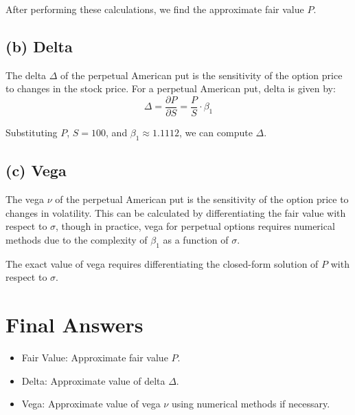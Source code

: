 \documentclass{article}
\begin{document}
After performing these calculations, we find the approximate fair value \( P \).

\subsection{\textbf{(b) Delta}}

The delta \( \Delta \) of the perpetual American put is the sensitivity of the option price to changes in the stock price. For a perpetual American put, delta is given by:
\[
\Delta = \frac{\partial P}{\partial S} = \frac{P}{S} \cdot \beta_1
\]

Substituting \( P \), \( S = 100 \), and \( \beta_1 \approx 1.1112 \), we can compute \( \Delta \).

\subsection{\textbf{(c) Vega}}

The vega \( \nu \) of the perpetual American put is the sensitivity of the option price to changes in volatility. This can be calculated by differentiating the fair value with respect to \( \sigma \), though in practice, vega for perpetual options requires numerical methods due to the complexity of \( \beta_1 \) as a function of \( \sigma \).

The exact value of vega requires differentiating the closed-form solution of \( P \) with respect to \( \sigma \).

\section*{\textbf{Final Answers}}
\begin{itemize}
    \item Fair Value: Approximate fair value \( P \).
    \item Delta: Approximate value of delta \( \Delta \).
    \item Vega: Approximate value of vega \( \nu \) using numerical methods if necessary.
\end{itemize}
\end{document}
